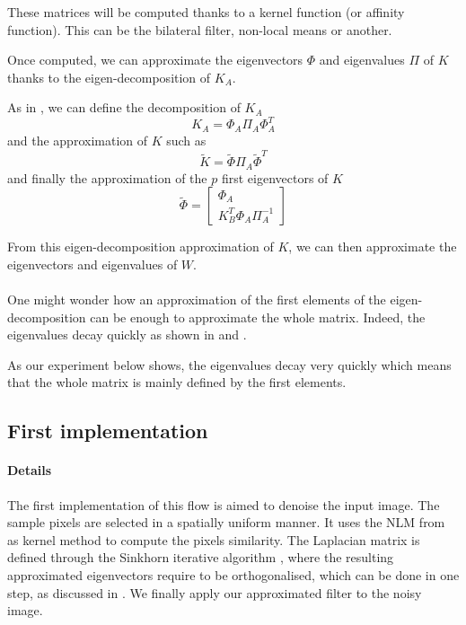 These matrices will be computed thanks to a kernel function (or affinity function). This can be the bilateral filter, non-local means or another.

Once computed, we can approximate the eigenvectors \(\Phi\) and eigenvalues \(\Pi\) of \(K\) thanks to the eigen-decomposition of \(K_A\).

As in \cite{glide_2014}, we can define the decomposition of \(K_A\)
\[K_A = \Phi_A \Pi_A \Phi_A^T\]
and the approximation of \(K\) such as
\[\tilde{K} = \tilde{\Phi} \Pi_A \tilde{\Phi}^T\]
and finally the approximation of the \(p\) first eigenvectors of \(K\)
\[
 \tilde{\Phi} = \begin{bmatrix}
  \Phi_A \\
  K_B^T \Phi_A \Pi_A^{-1}
 \end{bmatrix}
\]

From this eigen-decomposition approximation of \(K\), we can then approximate the eigenvectors and eigenvalues of \(W\).

\paragraph{}
One might wonder how an approximation of the first elements of the eigen-decomposition can be enough to approximate the whole matrix.
Indeed, the eigenvalues decay quickly as shown in \cite{siam_slides_2016} and \cite{meyer_perturbation_2014}.

As our experiment below shows, the eigenvalues decay very quickly which means that the whole matrix is mainly defined by the first elements.



\subsection{First implementation}

\paragraph{Details}
The first implementation of this flow is aimed to denoise the input image.
The sample pixels are selected in a spatially uniform manner.
It uses the NLM from \cite{buades_review_2005} as kernel method to compute the pixels similarity.
The Laplacian matrix is defined through the Sinkhorn iterative algorithm \cite{milanfar_symmetrizing_2013}, where the resulting approximated eigenvectors require to be orthogonalised, which can be done in one step, as discussed in \cite{fowlkes_spectral_2004}.
We finally apply our approximated filter to the noisy image.

